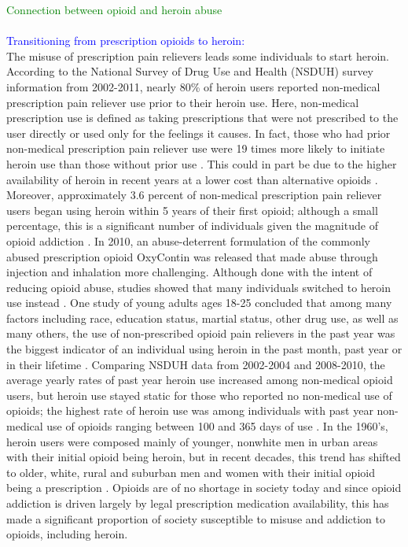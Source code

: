 \documentclass[12pt]{article}
\begin{document}
\textcolor{green}{Connection between opioid and heroin abuse} \\ \\
\textcolor{blue}{Transitioning from prescription opioids to heroin:} \\
The misuse of prescription pain relievers leads some individuals to start heroin. According to the National Survey of Drug Use and Health (NSDUH) survey information from 2002-2011, nearly 80\% of heroin users reported non-medical prescription pain reliever use prior to their heroin use. Here, non-medical prescription use is defined as taking prescriptions that were not prescribed to the user directly or used only for the feelings it causes. In fact, those who had prior non-medical prescription pain reliever use were 19 times more likely to initiate heroin use than those without prior use \cite{Muhuri}. This could in part be due to the higher availability of heroin in recent years at a lower cost than alternative opioids \cite{NIDA1}. Moreover, approximately 3.6 percent of non-medical prescription pain reliever users began using heroin within 5 years of their first opioid; although a small percentage, this is a significant number of individuals given the magnitude of opioid addiction \cite{Muhuri}. In 2010, an abuse-deterrent formulation of the commonly abused prescription opioid OxyContin was released that made abuse through injection and inhalation more challenging. Although done with the intent of reducing opioid abuse, studies showed that many individuals switched to heroin use instead \cite{Cicero2, Cicero3}. One study of young adults ages 18-25 concluded that among many factors including race, education status, martial status, other drug use, as well as many others, the use of non-prescribed opioid pain relievers in the past year was the biggest indicator of an individual using heroin in the past month, past year or in their lifetime \cite{Ihongbe}. Comparing NSDUH data from 2002-2004 and 2008-2010, the average yearly rates of past year heroin use increased among non-medical opioid users, but heroin use stayed static for those who reported no non-medical use of opioids; the highest rate of heroin use was among individuals with past year non-medical use of opioids ranging between 100 and 365 days of use \cite{Jones}. In the 1960's, heroin users were composed mainly of younger, nonwhite men in urban areas with their initial opioid being heroin, but in recent decades, this trend has shifted to older, white, rural and suburban men and women with their initial opioid being a prescription \cite{Cicero}. Opioids are of no shortage in society today and since opioid addiction is driven largely by legal prescription medication availability, this has made a significant proportion of society susceptible to misuse and addiction to opioids, including heroin. 
\end{document}
